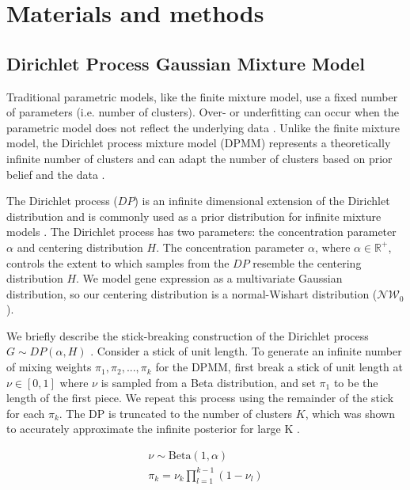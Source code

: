 \documentclass[10pt,letterpaper]{article}
\begin{document}
\section*{Materials and methods}
\subsection{Dirichlet Process Gaussian Mixture Model}

Traditional parametric models, like the finite mixture model, use a fixed number of parameters (i.e. number of clusters). Over- or underfitting can occur when the parametric model does not reflect the underlying data \cite{teh2010dirichlet}. Unlike the finite mixture model, the Dirichlet process mixture model (DPMM) represents a theoretically infinite number of clusters and can adapt the number of clusters based on prior belief and the data \cite{gelmanBayesianDataAnalysis2013, antoniakMixturesDirichletProcesses1974, teh2010dirichlet}.

The Dirichlet process ($DP$) is an infinite dimensional extension of the Dirichlet distribution \cite{fergusonBayesianAnalysisNonparametric1973} and is commonly used as a prior distribution for infinite mixture models \cite{muller2004nonparametric, gorurDirichletProcessGaussian2010}. The Dirichlet process has two parameters: the concentration parameter $\alpha$ and centering distribution $H$. The concentration parameter $\alpha$, where $\alpha \in \mathbb{R}^+$, controls the extent to which samples from the $DP$ resemble the centering distribution $H$. We model gene expression as a multivariate Gaussian distribution, so our centering distribution is a normal-Wishart distribution ($\mathcal{NW}_0$).

We briefly describe the stick-breaking construction of the Dirichlet process $G \sim DP(\alpha, H)$ \cite{hughes2013memoized, teh2010dirichlet, gelmanBayesianDataAnalysis2013, fergusonBayesianAnalysisNonparametric1973}. Consider a stick of unit length. To generate an infinite number of mixing weights $\pi_1, \pi_2, ..., \pi_k$ for the DPMM, first break a stick of unit length at $\nu \in [0, 1]$ where $\nu$ is sampled from a Beta distribution, and set $\pi_1$ to be the length of the first piece. We repeat this process using the remainder of the stick for each $\pi_k$. The DP is truncated to the number of clusters $K$, which was shown to accurately approximate the infinite posterior for large K \cite{hughes2013memoized}.


\begin{gather}
\label{eq:dp}
\nu \sim \text{Beta}(1, \alpha) \\
\pi_k = \nu_k \prod_{l=1}^{k-1}(1 - \nu_l)
\end{gather}
\end{document}

